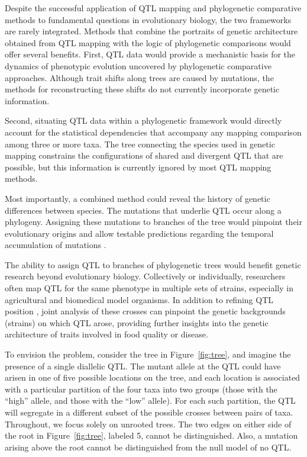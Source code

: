 \documentclass[12pt,letterpaper]{article}
\begin{document}
Despite the successful application of QTL mapping and phylogenetic
comparative methods to fundamental questions in evolutionary biology,
the two frameworks are rarely integrated. Methods that combine the
portraits of genetic architecture obtained from QTL mapping with the
logic of phylogenetic comparisons would offer several benefits. First,
QTL data would provide a mechanistic basis for the dynamics of
phenotypic evolution uncovered by phylogenetic comparative
approaches. Although trait shifts along trees are caused by mutations,
the methods for reconstructing these shifts do not currently
incorporate genetic information.

Second, situating QTL data within a phylogenetic framework would
directly account for the statistical dependencies that accompany any
mapping comparison among three or more taxa. The tree connecting the
species used in genetic mapping constrains the configurations of
shared and divergent QTL that are possible, but this information is
currently ignored by most QTL mapping methods.

Most importantly, a combined method could reveal the history of
genetic differences between species. The mutations that underlie QTL
occur along a phylogeny. Assigning these mutations to branches of the
tree would pinpoint their evolutionary origins and allow testable predictions
regarding the temporal accumulation of mutations 
\citep{Moyle2009}.

The ability to assign QTL to branches of phylogenetic trees would
benefit genetic research beyond evolutionary biology. Collectively or
individually, researchers often map QTL for the same phenotype in
multiple sets of strains, especially in agricultural and biomedical
model organisms. In addition to refining QTL position \citep{Li2005},
joint analysis of these crosses can pinpoint the genetic backgrounds
(strains) on which QTL arose, providing further insights into the
genetic architecture of traits involved in food quality or disease.

To envision the problem, consider the tree in
Figure~\ref{fig:tree}, and imagine the presence of a single diallelic
QTL.  The mutant allele at the QTL could have arisen in one of five
possible locations on the tree, and each location is associated with a
particular partition of the four taxa into two groups (those with the
``high'' allele, and those with the ``low'' allele).  For each such
partition, the QTL will segregate in a different subset of the
possible crosses between pairs of taxa.  Throughout, 
we focus solely on unrooted trees.  The two edges on either side of
the root in Figure~\ref{fig:tree}, labeled 5, cannot be
distinguished.  Also, a mutation arising above the root cannot be
distinguished from the null model of no QTL.
\end{document}
